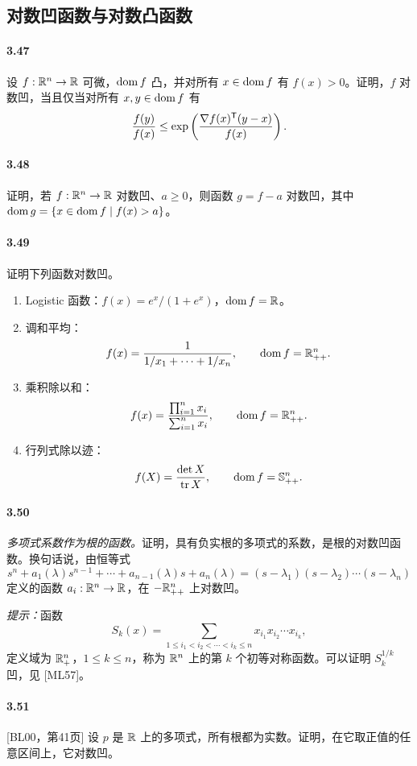 \subsection*{对数凹函数与对数凸函数}
\paragraph{3.47}设 $f:\mathbb R^n\to\mathbb R$ 可微，$\operatorname{dom} f$ 凸，并对所有 $x\in\operatorname{dom} f$ 有 $f(x)>0$。证明，$f$ 对数凹，当且仅当对所有 $x,y\in\operatorname{dom} f$ 有
\[\frac{f(y)}{f(x)}\leq\exp\left(\frac{\nabla f(x)^\mathsf T(y-x)}{f(x)}\right).\]
\paragraph{3.48}证明，若 $f:\mathbb R^n\to\mathbb R$ 对数凹、$a\geq0$，则函数 $g=f-a$ 对数凹，其中 $\operatorname{dom} g=\{x\in\operatorname{dom} f\mid f(x)>a\}$。
\paragraph{3.49}证明下列函数对数凹。
\begin{enumerate}[label=(\alph*)]
\item Logistic 函数：$f(x)=e^x/(1+e^x)$，$\operatorname{dom} f=\mathbb R$。
\item 调和平均：
\[f(x)=\frac1{1/x_1+\cdots+1/x_n},\qquad\operatorname{dom} f=\mathbb R_{++}^n.\]
\item 乘积除以和：
\[f(x)=\frac{\prod_{i=1}^n x_i}{\sum_{i=1}^n x_i},\qquad\operatorname{dom} f=\mathbb R_{++}^n.\]
\item 行列式除以迹：
\[f(X)=\frac{\det X}{\operatorname{tr} X},\qquad\operatorname{dom} f=\mathbb S_{++}^n.\]
\end{enumerate}
\paragraph{3.50}\textit{多项式系数作为根的函数。}证明，具有负实根的多项式的系数，是根的对数凹函数。换句话说，由恒等式
\[s^n+a_1(\lambda)s^{n-1}+\cdots+a_{n-1}(\lambda)s+a_n(\lambda)
 =(s-\lambda_1)(s-\lambda_2)\cdots(s-\lambda_n)\]
定义的函数 $a_i:\mathbb R^n\to\mathbb R$，在 $-\mathbb R_{++}^n$ 上对数凹。

\textit{提示：}函数
\[S_k(x)=\sum_{1\leq i_1<i_2<\cdots<i_k\leq n}x_{i_1}x_{i_2}\cdots x_{i_k},\]
定义域为 $\mathbb R_+^n$，$1\leq k\leq n$，称为 $\mathbb R^n$ 上的第 $k$ 个初等对称函数。可以证明 $S_k^{1/k}$ 凹，见 [ML57]。
\paragraph{3.51}[BL00，第41页] 设 $p$ 是 $\mathbb R$ 上的多项式，所有根都为实数。证明，在它取正值的任意区间上，它对数凹。
